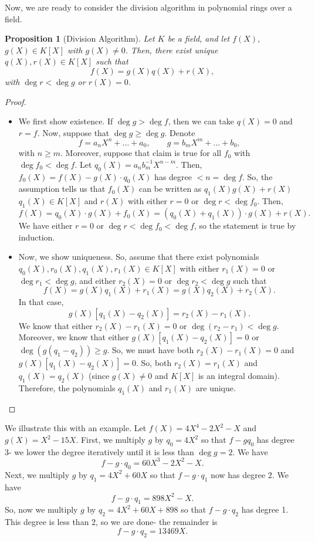 \documentclass[a4paper, openany]{memoir}
\theoremstyle{definition}
\theoremstyle{plain}
\newtheorem{proposition}[definition]{Proposition}
\begin{document}
Now, we are ready to consider the division algorithm in polynomial rings over a field.
\begin{proposition}[Division Algorithm]
Let $K$ be a field, and let $f(X),$ $g(X) \in K[X]$ with $g(X) \neq 0$. Then, there exist unique $q(X), r(X) \in K[X]$ such that
\[f(X) = g(X) q(X) + r(X),\]
with $\deg r < \deg g$ or $r(X) = 0$.
\end{proposition}
\begin{proof}
\hspace*{0pt}
\begin{itemize}
    \item We first show existence. If $\deg g > \deg f$, then we can take $q(X) = 0$ and $r = f$. Now, suppose that $\deg g \geqslant \deg g$. Denote
    \[f = a_n X^n + \dots + a_0, \qquad g = b_m X^m + \dots + b_0,\]
    with $n \geqslant m$. Moreover, suppose that claim is true for all $f_0$ with $\deg f_0 < \deg f$. Let $q_0(X) = a_n b_m^{-1} X^{n-m}$. Then, $f_0(X) = f(X) - g(X) \cdot q_0(X)$ has degree $< n = \deg f$. So, the assumption tells us that $f_0(X)$ can be written as $q_1(X) g(X) + r(X)$ $q_1(X) \in K[X]$ and $r(X)$ with either $r = 0$ or $\deg r < \deg f_0$. Then,
    \[f(X) = q_0(X) \cdot g(X) + f_0(X) = (q_0(X) + q_1(X)) \cdot g(X) + r(X).\]
    We have either $r = 0$ or $\deg r < \deg f_0 < \deg f$, so the statement is true by induction.
    
    \item Now, we show uniqueness. So, assume that there exist polynomials $q_0(X), r_0(X), q_1(X), r_1(X) \in K[X]$ with either $r_1(X) = 0$ or $\deg r_1 < \deg g$, and either $r_2(X) = 0$ or $\deg r_2 < \deg g$ such that
    \[f(X) = g(X) q_1(X) + r_1(X) = g(X) q_2(X) + r_2(X).\]
    In that case,
    \[g(X) [q_1(X) - q_2(X)] = r_2(X) - r_1(X).\]
    We know that either $r_2(X) - r_1(X) = 0$ or $\deg (r_2 - r_1) < \deg g$. Moreover, we know that either $g(X) [q_1(X) - q_2(X)] = 0$ or $\deg (g(q_1 - q_2)) \geqslant g$. So, we must have both $r_2(X) - r_1(X) = 0$ and $g(X) [q_1(X) - q_2(X)] = 0$. So, both $r_2(X) = r_1(X)$ and $q_1(X) = q_2(X)$ (since $g(X) \neq 0$ and $K[X]$ is an integral domain). Therefore, the polynomials $q_1(X)$ and $r_1(X)$ are unique.
\end{itemize}
\end{proof}
\noindent We illustrate this with an example. Let $f(X) = 4X^4 - 2X^2 - X$ and $g(X) = X^2 - 15X$. First, we multiply $g$ by $q_0 = 4X^2$ so that $f - gq_0$ has degree 3- we lower the degree iteratively until it is less than $\deg g = 2$. We have
\[f - g \cdot q_0 = 60X^3 - 2X^2 - X.\]
Next, we multiply $g$ by $q_1 = 4X^2 + 60X$ so that $f - g \cdot q_1$ now has degree 2. We have
\[f - g \cdot q_1 = 898X^2 - X.\]
So, now we multiply $g$ by $q_2 = 4X^2 + 60X + 898$ so that $f - g \cdot q_2$ has degree 1. This degree is less than 2, so we are done- the remainder is
\[f - g \cdot q_2 = 13469X.\]
\end{document}
